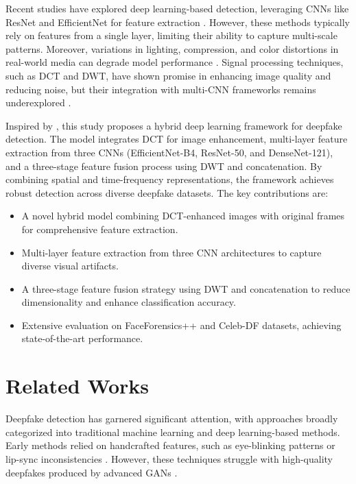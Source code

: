 \documentclass[12pt]{article}
\begin{document}
Recent studies have explored deep learning-based detection, leveraging CNNs like ResNet and EfficientNet for feature extraction \citep{chollet2017xception, tan2019efficientnet}. However, these methods typically rely on features from a single layer, limiting their ability to capture multi-scale patterns. Moreover, variations in lighting, compression, and color distortions in real-world media can degrade model performance \citep{westerlund2019emergence}. Signal processing techniques, such as DCT and DWT, have shown promise in enhancing image quality and reducing noise, but their integration with multi-CNN frameworks remains underexplored \citep{mukherjee2008enhancement, shensa1992discrete}.

Inspired by \citet{attallah2024hybrid}, this study proposes a hybrid deep learning framework for deepfake detection. The model integrates DCT for image enhancement, multi-layer feature extraction from three CNNs (EfficientNet-B4, ResNet-50, and DenseNet-121), and a three-stage feature fusion process using DWT and concatenation. By combining spatial and time-frequency representations, the framework achieves robust detection across diverse deepfake datasets. The key contributions are:

\begin{itemize}
    \item A novel hybrid model combining DCT-enhanced images with original frames for comprehensive feature extraction.
    \item Multi-layer feature extraction from three CNN architectures to capture diverse visual artifacts.
    \item A three-stage feature fusion strategy using DWT and concatenation to reduce dimensionality and enhance classification accuracy.
    \item Extensive evaluation on FaceForensics++ and Celeb-DF datasets, achieving state-of-the-art performance.
\end{itemize}

\section{Related Works}
Deepfake detection has garnered significant attention, with approaches broadly categorized into traditional machine learning and deep learning-based methods. Early methods relied on handcrafted features, such as eye-blinking patterns or lip-sync inconsistencies \citep{li2018ictu}. However, these techniques struggle with high-quality deepfakes produced by advanced GANs \citep{karras2019style}.
\end{document}
